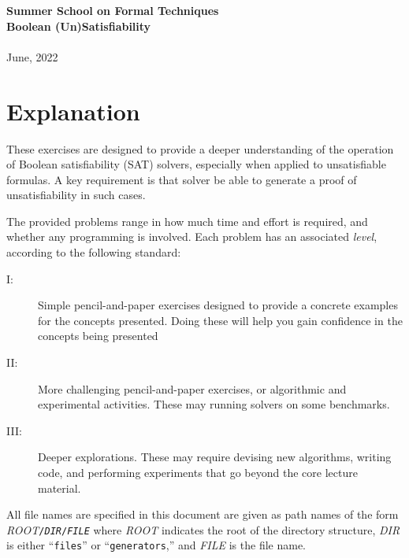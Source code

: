 
\usepackage[pdftex]{graphicx}


\usepackage{exercise}
\usepackage{enumitem}
\usepackage{color}
\usepackage{booktabs}
\usepackage{tikz}

\newcommand{\proofhu}[1]{${\it HU}(\texttt{#1})$}
\newcommand{\prooflu}[1]{${\it LU}(\texttt{#1})$}
\newcommand{\proofhd}[1]{${\it HD}(\texttt{#1})$}
\newcommand{\proofld}[1]{${\it LD}(\texttt{#1})$}

\newcommand{\pathname}[2]{\textit{ROOT}\texttt{/}\texttt{#1}\texttt{/}\texttt{#2}}


\begin{center}
{\LARGE\bf Summer School on Formal Techniques\\ [1.5 ex]
Boolean (Un)Satisfiability \\[2ex]
}\\ [2 ex]
June, 2022
\end{center}
\section*{Explanation}

These exercises are designed to provide a deeper understanding of the
operation of Boolean satisfiability (SAT) solvers, especially when
applied to unsatisfiable formulas.  A key requirement is that solver
be able to generate a proof of unsatisfiability in such cases.

The provided problems range in how much time and effort is required,
and whether any programming is involved.  Each problem has an
associated {\em level}, according to the following standard:
\begin{description}
\item[I:] Simple pencil-and-paper exercises designed to provide a
  concrete examples for the concepts presented.  Doing these will
  help you gain confidence in the concepts being presented
\item[II:] More challenging pencil-and-paper exercises, or algorithmic
  and experimental activities.  These may running solvers on some
  benchmarks.
\item[III:] Deeper explorations.  These may require devising new
  algorithms, writing code, and performing experiments that go beyond
  the core lecture material.
\end{description}

All file names are specified in this document are given as path names
of the form
\pathname{\textit{DIR}}{\textit{FILE}}
where
\textit{ROOT} indicates the root of the directory structure,
\textit{DIR} is either ``\texttt{files}'' or ``\texttt{generators},''
and \textit{FILE} is the file name.


